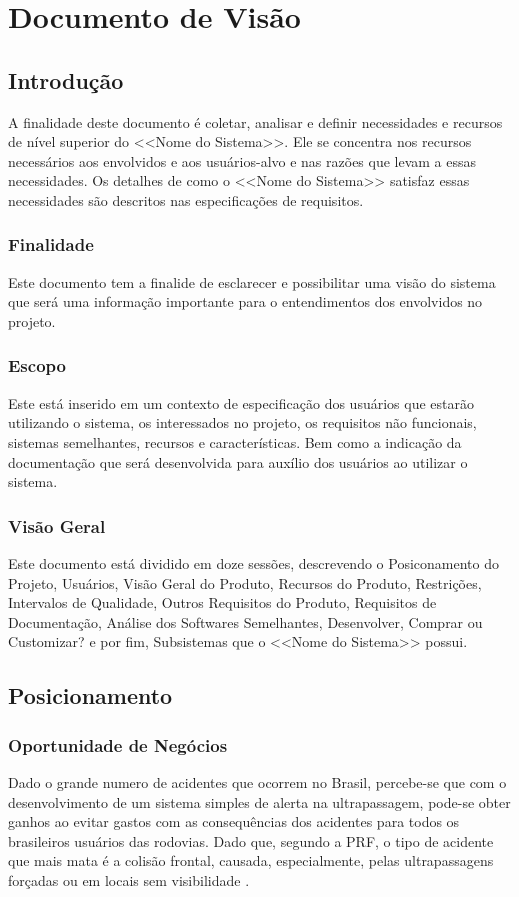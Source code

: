\chapter[Documento de Visão]{Documento de Visão}

\section{Introdução}
A finalidade deste documento é coletar, analisar e definir necessidades e recursos de nível superior do <<Nome do Sistema>>. Ele se concentra nos recursos necessários aos envolvidos e aos usuários-alvo e nas razões que levam a essas necessidades. Os detalhes de como o <<Nome do Sistema>> satisfaz essas necessidades são descritos nas especificações de requisitos.

\subsection{Finalidade}
Este documento tem a finalide de  esclarecer e possibilitar uma visão do sistema que será uma informação importante para o entendimentos dos envolvidos no projeto.
\subsection{Escopo}
Este está inserido em um contexto de especificação dos usuários que estarão utilizando o sistema, os interessados no projeto, os requisitos não funcionais, sistemas semelhantes, recursos e características. Bem como a indicação da documentação que será desenvolvida para auxílio dos usuários ao utilizar o sistema.
\subsection{Visão Geral}
Este documento está dividido em doze sessões, descrevendo o Posiconamento do Projeto, Usuários, Visão Geral do Produto, Recursos do Produto, Restrições, Intervalos de Qualidade, Outros Requisitos do Produto, Requisitos de Documentação, Análise dos Softwares Semelhantes, Desenvolver, Comprar ou Customizar? e por fim, Subsistemas que o <<Nome do Sistema>> possui.


\section{Posicionamento}

\subsection{Oportunidade de Negócios}
Dado o grande numero de acidentes que ocorrem no Brasil, percebe-se que com o
desenvolvimento de um sistema simples de alerta na ultrapassagem, pode-se obter
ganhos ao evitar gastos com as consequências dos acidentes para todos os
brasileiros usuários das rodovias. Dado que, segundo a PRF, o tipo de acidente
que mais mata é a colisão frontal, causada, especialmente, pelas ultrapassagens
forçadas ou em locais sem visibilidade \cite{prf}.

